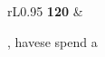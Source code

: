 {\begin{tabular}{rL{0.95\linewidth}}
\textbf{120} &\strut{}\smallmasktok{}\smallmasktok{}\smallmasktok{}\smallmasktok{}\smallmasktok{}\smallmasktok{}\smallmasktok{}\smallmasktok{}\smallmasktok{}\smallmasktok{}\smallmasktok{}\smallmasktok{}\smallmasktok{}\smallmasktok{}\smallmasktok{}\smallmasktok{}\smallmasktok{}\smallmasktok{}\smallmasktok{}\smallmasktok{}\smallmasktok{}\smallmasktok{}\smallmasktok{}\smallmasktok{}\smallmasktok{}\smallmasktok{}\smallmasktok{}\smallmasktok{}\smallmasktok{}\smallmasktok{}\smallmasktok{}\smallmasktok{}\smallmasktok{}\smallmasktok{}\smallmasktok{}\smallmasktok{}\smallmasktok{},\smallmasktok{} have\smallmasktok{}s\smallmasktok{}\smallmasktok{}\smallmasktok{}\smallmasktok{}\smallmasktok{}\smallmasktok{}\smallmasktok{}\smallmasktok{}\smallmasktok{}\smallmasktok{}\smallmasktok{}\smallmasktok{}\smallmasktok{}\smallmasktok{}\smallmasktok{}\smallmasktok{}\smallmasktok{}e\smallmasktok{}\smallmasktok{}\smallmasktok{}\smallmasktok{}\smallmasktok{}\smallmasktok{}\smallmasktok{}\smallmasktok{}\smallmasktok{}\smallmasktok{}\smallmasktok{}\smallmasktok{}\smallmasktok{}\smallmasktok{}\smallmasktok{}\smallmasktok{}\smallmasktok{}\smallmasktok{}\smallmasktok{}\smallmasktok{}\smallmasktok{}\smallmasktok{}\smallmasktok{}\smallmasktok{}\smallmasktok{}\smallmasktok{}\smallmasktok{}\smallmasktok{}\smallmasktok{} spend\smallmasktok{}\smallmasktok{}\smallmasktok{}\smallmasktok{}\smallmasktok{}\smallmasktok{}\smallmasktok{}\smallmasktok{}\smallmasktok{}\smallmasktok{}\smallmasktok{}\smallmasktok{}\smallmasktok{}\smallmasktok{}\smallmasktok{}\smallmasktok{}\smallmasktok{}\smallmasktok{}\smallmasktok{}\smallmasktok{}\smallmasktok{}\smallmasktok{}\smallmasktok{}\smallmasktok{}\smallmasktok{}\smallmasktok{} a\smallmasktok{}\smallmasktok{}\smallmasktok{}\smallmasktok{}\smallmasktok{}\smallmasktok{}\smallmasktok{}\smallmasktok{}\smallmasktok{}\smallmasktok{}\\

\end{tabular}}
